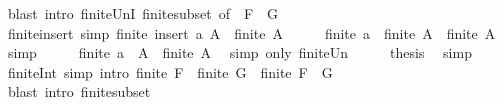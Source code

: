 \begin{isabellebody}
\ {\isacharparenleft}{\kern0pt}blast\ intro{\isacharcolon}{\kern0pt}\ finite{\isacharunderscore}{\kern0pt}UnI\ finite{\isacharunderscore}{\kern0pt}subset\ {\isacharbrackleft}{\kern0pt}of\ {\isacharunderscore}{\kern0pt}\ {\isachardoublequoteopen}F\ {\isasymunion}\ G{\isachardoublequoteclose}{\isacharbrackright}{\kern0pt}{\isacharparenright}{\kern0pt}%
\endisatagproof
{\isafoldproof}%
%
\isadelimproof
\isanewline
%
\endisadelimproof
\isanewline
{}\isamarkupfalse%
\ finite{\isacharunderscore}{\kern0pt}insert\ {\isacharbrackleft}{\kern0pt}simp{\isacharbrackright}{\kern0pt}{\isacharcolon}{\kern0pt}\ {\isachardoublequoteopen}finite\ {\isacharparenleft}{\kern0pt}insert\ a\ A{\isacharparenright}{\kern0pt}\ {\isasymlongleftrightarrow}\ finite\ A{\isachardoublequoteclose}\isanewline
%
\isadelimproof
%
\endisadelimproof
%
\isatagproof
{}\isamarkupfalse%
\ {\isacharminus}{\kern0pt}\isanewline
\ \ \isamarkupfalse%
\ {\isachardoublequoteopen}finite\ {\isacharbraceleft}{\kern0pt}a{\isacharbraceright}{\kern0pt}\ {\isasymand}\ finite\ A\ {\isasymlongleftrightarrow}\ finite\ A{\isachardoublequoteclose}\ \isamarkupfalse%
\ simp\isanewline
\ \ \isamarkupfalse%
\ \isamarkupfalse%
\ {\isachardoublequoteopen}finite\ {\isacharparenleft}{\kern0pt}{\isacharbraceleft}{\kern0pt}a{\isacharbraceright}{\kern0pt}\ {\isasymunion}\ A{\isacharparenright}{\kern0pt}\ {\isasymlongleftrightarrow}\ finite\ A{\isachardoublequoteclose}\ \isamarkupfalse%
\ {\isacharparenleft}{\kern0pt}simp\ only{\isacharcolon}{\kern0pt}\ finite{\isacharunderscore}{\kern0pt}Un{\isacharparenright}{\kern0pt}\isanewline
\ \ \isamarkupfalse%
\ \isamarkupfalse%
\ {\isacharquery}{\kern0pt}thesis\ \isamarkupfalse%
\ simp\isanewline
{}\isamarkupfalse%
%
\endisatagproof
{\isafoldproof}%
%
\isadelimproof
\isanewline
%
\endisadelimproof
\isanewline
{}\isamarkupfalse%
\ finite{\isacharunderscore}{\kern0pt}Int\ {\isacharbrackleft}{\kern0pt}simp{\isacharcomma}{\kern0pt}\ intro{\isacharbrackright}{\kern0pt}{\isacharcolon}{\kern0pt}\ {\isachardoublequoteopen}finite\ F\ {\isasymor}\ finite\ G\ {\isasymLongrightarrow}\ finite\ {\isacharparenleft}{\kern0pt}F\ {\isasyminter}\ G{\isacharparenright}{\kern0pt}{\isachardoublequoteclose}\isanewline
%
\isadelimproof
\ \ %
\endisadelimproof
%
\isatagproof
{}\isamarkupfalse%
\ {\isacharparenleft}{\kern0pt}blast\ intro{\isacharcolon}{\kern0pt}\ finite{\isacharunderscore}{\kern0pt}subset{\isacharparenright}{\kern0pt}%

\end{isabellebody}
